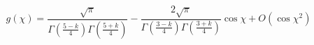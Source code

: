 \begin{equation}
g(\chi) = \frac{\sqrt{\pi}}{\Gamma{\left(\frac{5-k}{4}\right)} \Gamma{\left(\frac{5+k}{4}\right)}} - \frac{2 \sqrt{\pi}}{\Gamma{\left(\frac{3-k}{4}\right)} \Gamma{\left(\frac{3+k}{4}\right)}} \cos{\chi} + O(\cos{\chi}^2)
\end{equation}

